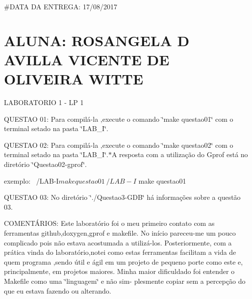 \#\+D\+A\+TA DA E\+N\+T\+R\+E\+GA\+: 17/08/2017 \section*{A\+L\+U\+NA\+: R\+O\+S\+A\+N\+G\+E\+LA D A\+V\+I\+L\+LA V\+I\+C\+E\+N\+TE DE O\+L\+I\+V\+E\+I\+RA W\+I\+T\+TE}

L\+A\+B\+O\+R\+A\+T\+O\+R\+IO 1 -\/ LP 1


\begin{DoxyItemize}
\item Q\+U\+E\+S\+T\+AO 01\+: Para compilá-\/la ,execute o comando \char`\"{}make questao01\char`\"{} com o terminal setado na pasta \char`\"{}\+L\+A\+B\+\_\+\+I\char`\"{}.
\item Q\+U\+E\+S\+T\+AO 02\+: Para compilá-\/la ,execute o comando \char`\"{}make questao02\char`\"{} com o terminal setado na pasta \char`\"{}\+L\+A\+B\+\_\+\+I\char`\"{}.$\ast$A resposta com a utilização do Gprof está no diretório \char`\"{}\+Questao02-\/gprof\char`\"{}.
\end{DoxyItemize}

\begin{DoxyVerb}exemplo:
    ~/LAB-I$ make questao01 
    ~/LAB-I$ make questao01
\end{DoxyVerb}



\begin{DoxyItemize}
\item Q\+U\+E\+S\+T\+AO 03\+: No diretório \char`\"{}./\+Questao3-\/\+G\+D\+B\char`\"{} há informações sobre a questão 03.
\end{DoxyItemize}

C\+O\+M\+E\+N\+TÁ\+R\+I\+OS\+: Este laboratório foi o meu primeiro contato com as ferramentas github,doxygen,gprof e makefile. No início pareceu-\/me um pouco complicado pois não estava acostumada a utilizá-\/los. Posteriormente, com a prática vinda do laboratório,notei como estas ferramentas facilitam a vida de quem programa ,sendo útil e ágil em um projeto de pequeno porte como este e, principalmente, em projetos maiores. Minha maior dificuldado foi entender o Makefile como uma \char`\"{}linguagem\char`\"{} e não sim-\/ plesmente copiar sem a percepção do que eu estava fazendo ou alterando. 